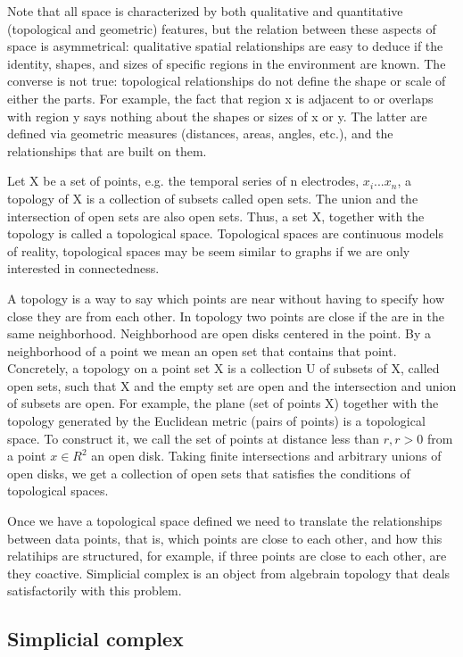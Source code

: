 \documentclass[onecollarge,runningheads]{svjour2}
\begin{document}
Note that all space is characterized by both qualitative and quantitative (topological and geometric) features, but the relation between these aspects of space is asymmetrical: qualitative spatial relationships are easy to deduce if the identity, shapes, and sizes of specific regions in the environment are known. 
The converse is not true: topological relationships do not define the shape or scale of either the parts. For example, the fact that region x is adjacent to or overlaps with region y says nothing about the shapes or sizes of x or y. The latter are defined via geometric measures (distances, areas, angles, etc.), and the relationships that are built on them.

Let X be a set of points, e.g. the temporal series of n electrodes, $x_i ... x_n$, a topology of X is a collection of subsets called open sets. The union and the intersection of open sets are also open sets.
Thus, a set X, together with the topology is called a topological space. Topological spaces are continuous models of reality, topological spaces may be seem similar to graphs if we are only interested in connectedness.

A topology is a way to say which points are near without having to specify how close they are from each other. In topology two points are close if the are in the same neighborhood. Neighborhood are open disks centered in the point. By a neighborhood of a point we mean an open set that contains that point. 
Concretely, a topology on a point set X is a collection U of subsets of X, called open sets, such that X and the empty set are open and the intersection and union of subsets are open.
For example, the plane (set of points X) together with the topology generated by the Euclidean metric (pairs of points) is a topological space. To construct it, we call the set of points at distance less than $r, r > 0$ from a point $x \in R^2$ an open disk. Taking finite intersections and arbitrary unions of open disks, we get a collection of open sets that satisfies the conditions of topological spaces. 

Once we have a topological space defined we need to translate the relationships between data points, that is, which points are close to each other, and how this relatihips are structured, for example, if three points are close to each other, are they coactive.
Simplicial complex is an object from algebrain topology that deals satisfactorily with this problem.
 

\subsection{Simplicial complex} 
\end{document}
